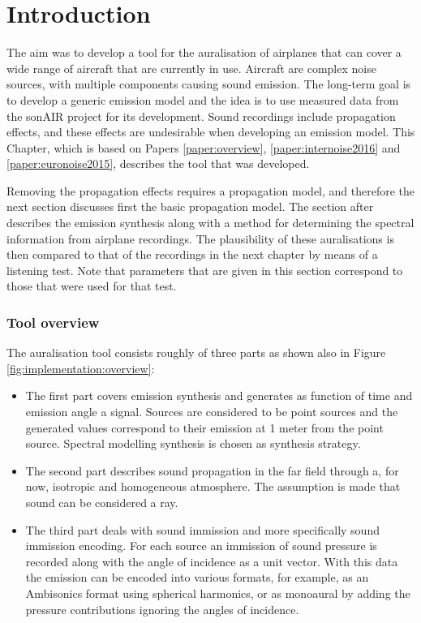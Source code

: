 \section{Introduction}

The aim was to develop a tool for the auralisation of airplanes that can cover a
wide range of aircraft that are currently in use. Aircraft are complex noise
sources, with multiple components causing sound emission. The long-term goal is
to develop a generic emission model and the idea is to use measured data
from the sonAIR project for its development. Sound
recordings include propagation effects, and these effects are undesirable when
developing an emission model. This Chapter, which is based on Papers
\ref{paper:overview}, \ref{paper:internoise2016} and \ref{paper:euronoise2015},
describes the tool that was developed.

Removing the propagation effects requires a propagation model, and therefore the
next section discusses first the basic propagation model. The section after
describes the emission synthesis along with a method for determining the
spectral information from airplane recordings. The plausibility of these
auralisations is then compared to that of the recordings in the next chapter by
means of a listening test. Note that parameters that are given in this section
correspond to those that were used for that test.


\subsubsection*{Tool overview}
The auralisation tool consists roughly of three parts as shown also in Figure
\ref{fig:implementation:overview}:

\begin{itemize}
\item The first part covers emission synthesis and generates as function of time and
emission angle a signal. Sources are considered to be point sources and the
generated values correspond to their emission at 1 meter from the point source.
Spectral modelling synthesis is chosen as synthesis strategy.

\item The second part describes sound propagation in the far field through a,
for now, isotropic and homogeneous atmosphere. The assumption is made that sound
can be considered a ray.

\item The third part deals with sound immission and more specifically sound immission
encoding. For each source an immission of sound pressure is recorded along with
the angle of incidence as a unit vector. With this data the emission can be
encoded into various formats, for example, as an Ambisonics format using
spherical harmonics, or as monoaural by adding the pressure contributions
ignoring the angles of incidence.
\end{itemize}

